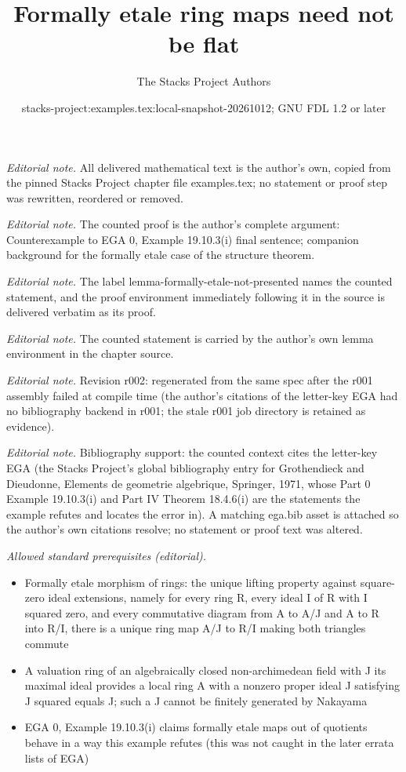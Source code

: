 \documentclass[10pt,a4paper]{amsart}
\title{Formally etale ring maps need not be flat}
\author{The Stacks Project Authors}
\date{stacks-project:examples.tex:local-snapshot-20261012; GNU FDL 1.2 or later}
\theoremstyle{plain}
\theoremstyle{definition}
\theoremstyle{remark}
\numberwithin{equation}{subsection}
\begin{document}
\maketitle
\noindent\textit{Editorial note.} All delivered mathematical text is the author's own, copied from the pinned Stacks Project chapter file examples.tex; no statement or proof step was rewritten, reordered or removed.\par\medskip
\noindent\textit{Editorial note.} The counted proof is the author's complete argument: Counterexample to EGA 0, Example 19.10.3(i) final sentence; companion background for the formally etale case of the structure theorem.\par\medskip
\noindent\textit{Editorial note.} The label lemma-formally-etale-not-presented names the counted statement, and the proof environment immediately following it in the source is delivered verbatim as its proof.\par\medskip
\noindent\textit{Editorial note.} The counted statement is carried by the author's own lemma environment in the chapter source.\par\medskip
\noindent\textit{Editorial note.} Revision r002: regenerated from the same spec after the r001 assembly failed at compile time (the author's citations of the letter-key EGA had no bibliography backend in r001; the stale r001 job directory is retained as evidence).\par\medskip
\noindent\textit{Editorial note.} Bibliography support: the counted context cites the letter-key EGA (the Stacks Project's global bibliography entry for Grothendieck and Dieudonne, Elements de geometrie algebrique, Springer, 1971, whose Part 0 Example 19.10.3(i) and Part IV Theorem 18.4.6(i) are the statements the example refutes and locates the error in). A matching ega.bib asset is attached so the author's own citations resolve; no statement or proof text was altered.\par\medskip
\noindent\textit{Allowed standard prerequisites (editorial).}\begin{itemize}
\item Formally etale morphism of rings: the unique lifting property against square-zero ideal extensions, namely for every ring R, every ideal I of R with I squared zero, and every commutative diagram from A to A/J and A to R into R/I, there is a unique ring map A/J to R/I making both triangles commute
\item A valuation ring of an algebraically closed non-archimedean field with J its maximal ideal provides a local ring A with a nonzero proper ideal J satisfying J squared equals J; such a J cannot be finitely generated by Nakayama
\item EGA 0, Example 19.10.3(i) claims formally etale maps out of quotients behave in a way this example refutes (this was not caught in the later errata lists of EGA)
\end{itemize}\medskip
\label{section-formally-etale-nonflat}
\end{document}
